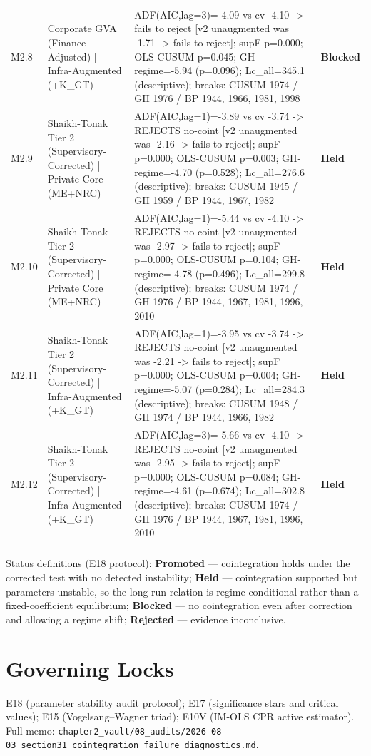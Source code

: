 \documentclass[11pt,a4paper]{article}
\begin{document}
\begin{longtable}{p{1.1cm}p{3.2cm}p{7.6cm}p{1.4cm}}
\addlinespace
M2.8 & Corporate GVA (Finance-Adjusted) | Infra-Augmented (+K\_GT) & ADF(AIC,lag=3)=-4.09 vs cv -4.10 -> fails to reject [v2 unaugmented was -1.71 -> fails to reject]; supF p=0.000; OLS-CUSUM p=0.045; GH-regime=-5.94 (p=0.096); Lc\_all=345.1 (descriptive); breaks: CUSUM 1974 / GH 1976 / BP 1944, 1966, 1981, 1998 & \textbf{Blocked} \\
\addlinespace
M2.9 & Shaikh-Tonak Tier 2 (Supervisory-Corrected) | Private Core (ME+NRC) & ADF(AIC,lag=1)=-3.89 vs cv -3.74 -> REJECTS no-coint [v2 unaugmented was -2.16 -> fails to reject]; supF p=0.000; OLS-CUSUM p=0.003; GH-regime=-4.70 (p=0.528); Lc\_all=276.6 (descriptive); breaks: CUSUM 1945 / GH 1959 / BP 1944, 1967, 1982 & \textbf{Held} \\
\addlinespace
M2.10 & Shaikh-Tonak Tier 2 (Supervisory-Corrected) | Private Core (ME+NRC) & ADF(AIC,lag=1)=-5.44 vs cv -4.10 -> REJECTS no-coint [v2 unaugmented was -2.97 -> fails to reject]; supF p=0.000; OLS-CUSUM p=0.104; GH-regime=-4.78 (p=0.496); Lc\_all=299.8 (descriptive); breaks: CUSUM 1974 / GH 1976 / BP 1944, 1967, 1981, 1996, 2010 & \textbf{Held} \\
\addlinespace
M2.11 & Shaikh-Tonak Tier 2 (Supervisory-Corrected) | Infra-Augmented (+K\_GT) & ADF(AIC,lag=1)=-3.95 vs cv -3.74 -> REJECTS no-coint [v2 unaugmented was -2.21 -> fails to reject]; supF p=0.000; OLS-CUSUM p=0.004; GH-regime=-5.07 (p=0.284); Lc\_all=284.3 (descriptive); breaks: CUSUM 1948 / GH 1974 / BP 1944, 1966, 1982 & \textbf{Held} \\
\addlinespace
M2.12 & Shaikh-Tonak Tier 2 (Supervisory-Corrected) | Infra-Augmented (+K\_GT) & ADF(AIC,lag=3)=-5.66 vs cv -4.10 -> REJECTS no-coint [v2 unaugmented was -2.95 -> fails to reject]; supF p=0.000; OLS-CUSUM p=0.084; GH-regime=-4.61 (p=0.674); Lc\_all=302.8 (descriptive); breaks: CUSUM 1974 / GH 1976 / BP 1944, 1967, 1981, 1996, 2010 & \textbf{Held} \\
\addlinespace
\bottomrule
\end{longtable}
\normalsize
\noindent\footnotesize Status definitions (E18 protocol): \textbf{Promoted} --- cointegration holds under the corrected test with no detected instability; \textbf{Held} --- cointegration supported but parameters unstable, so the long-run relation is regime-conditional rather than a fixed-coefficient equilibrium; \textbf{Blocked} --- no cointegration even after correction and allowing a regime shift; \textbf{Rejected} --- evidence inconclusive.\normalsize

\section*{Governing Locks}
E18 (parameter stability audit protocol); E17 (significance stars and critical values); E15 (Vogelsang--Wagner triad); E10V (IM-OLS CPR active estimator). Full memo: \texttt{chapter2\_vault/08\_audits/2026-08-03\_section31\_cointegration\_failure\_diagnostics.md}.
\end{document}
